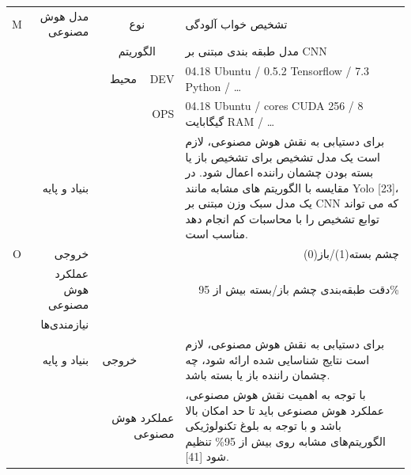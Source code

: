 \documentclass[a4paper,10pt]{article}
\begin{document}
\begin{table}[htbp]
\begin{tabularx}{\textwidth}{c c c c X}
            \multicolumn{1}{c}{M} & \multicolumn{1}{r}{مدل هوش مصنوعی} & \multicolumn{2}{c}{نوع} & تشخیص خواب آلودگی \\
            &  & \multicolumn{2}{c}{الگوریتم} & مدل طبقه بندی مبتنی بر CNN \\
            &  & \multicolumn{1}{r}{محیط} & \multicolumn{1}{r}{DEV} & 04.18 Ubuntu / 0.5.2 Tensorflow / 7.3 Python / \dots \\
            &  &  & \multicolumn{1}{r}{OPS} & 04.18 Ubuntu / cores CUDA 256 / 8 گیگابایت RAM / \dots \\
            & \multicolumn{1}{r}{بنیاد و پایه} &  &  & برای دستیابی به نقش هوش مصنوعی، لازم است یک مدل تشخیص برای تشخیص باز یا بسته بودن چشمان راننده اعمال شود. در مقایسه با الگوریتم های مشابه مانند Yolo [23]، یک مدل سبک وزن مبتنی بر CNN که می تواند توابع تشخیص را با محاسبات کم انجام دهد مناسب است. \\

            \multicolumn{1}{c}{O} & \multicolumn{1}{r}{خروجی} & \multicolumn{3}{r}{چشم بسته(1)/باز(0)} \\
            & \multicolumn{1}{r}{عملکرد هوش مصنوعی} & \multicolumn{3}{r}{دقت طبقه‌بندی چشم باز/بسته بیش از 95\%} \\
            & \multicolumn{1}{r}{نیازمندی‌ها} &  &  &  \\
            & \multicolumn{1}{r}{بنیاد و پایه} & \multicolumn{1}{r}{خروجی} &  & برای دستیابی به نقش هوش مصنوعی، لازم است نتایج شناسایی شده ارائه شود، چه چشمان راننده باز یا بسته باشد. \\
            &  & \multicolumn{2}{r}{عملکرد هوش مصنوعی} & با توجه به اهمیت نقش هوش مصنوعی، عملکرد هوش مصنوعی باید تا حد امکان بالا باشد و با توجه به بلوغ تکنولوژیکی الگوریتم‌های مشابه روی بیش از 95\% تنظیم شود [41]. \\
            

\end{tabularx}
\end{table}
\end{document}
